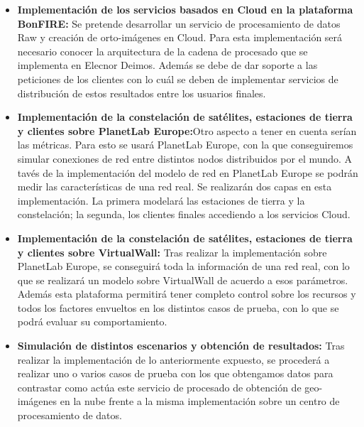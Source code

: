 \begin{itemize}

\item \textbf{Implementación de los servicios basados en Cloud en la plataforma BonFIRE:}  Se pretende desarrollar un servicio de procesamiento de datos Raw y creación de orto-imágenes en Cloud. Para esta implementación será necesario conocer la arquitectura de la cadena de procesado que se implementa en Elecnor Deimos. Además se debe de dar soporte a las peticiones de los clientes con lo cuál se deben de implementar servicios de distribución de estos resultados entre los usuarios finales.

\item \textbf{Implementación de la constelación de satélites, estaciones de tierra y clientes sobre PlanetLab Europe:}Otro aspecto a tener en cuenta serían las métricas. Para esto se usará PlanetLab Europe, con la que conseguiremos simular conexiones de red entre distintos nodos distribuidos por el mundo.
A tavés de la implementación del modelo de red en PlanetLab Europe se podrán medir las características de una red real. Se realizarán dos capas en esta implementación. La primera modelará las estaciones de tierra y la constelación; la segunda, los clientes finales accediendo a los servicios Cloud.

\item \textbf{Implementación de la constelación de satélites, estaciones de tierra y clientes sobre VirtualWall:} Tras realizar la implementación sobre PlanetLab Europe, se conseguirá toda la información de una red real, con lo que se realizará un modelo sobre VirtualWall de acuerdo a esos parámetros. Además esta plataforma permitirá tener completo control sobre los recursos y todos los factores envueltos en los distintos casos de prueba, con lo que se podrá evaluar su comportamiento.

\item \textbf{Simulación de distintos escenarios y obtención de resultados:} Tras realizar la implementación de lo anteriormente expuesto, se procederá a realizar uno o varios casos de prueba con los que obtengamos datos para contrastar como actúa este servicio de procesado de obtención de geo-imágenes en la nube frente a la misma implementación sobre un centro de procesamiento de datos.



\end{itemize}







